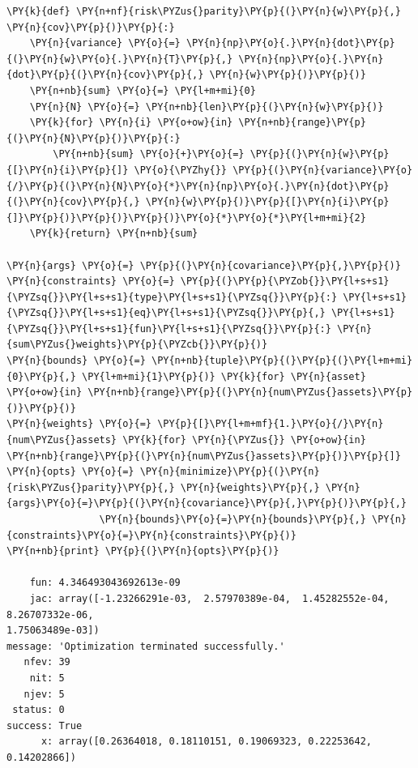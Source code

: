 \begin{tcolorbox}[breakable, size=fbox, boxrule=1pt, pad at break*=1mm,colback=cellbackground, colframe=cellborder]
\begin{Verbatim}[commandchars=\\\{\}]
\PY{k}{def} \PY{n+nf}{risk\PYZus{}parity}\PY{p}{(}\PY{n}{w}\PY{p}{,} \PY{n}{cov}\PY{p}{)}\PY{p}{:}
    \PY{n}{variance} \PY{o}{=} \PY{n}{np}\PY{o}{.}\PY{n}{dot}\PY{p}{(}\PY{n}{w}\PY{o}{.}\PY{n}{T}\PY{p}{,} \PY{n}{np}\PY{o}{.}\PY{n}{dot}\PY{p}{(}\PY{n}{cov}\PY{p}{,} \PY{n}{w}\PY{p}{)}\PY{p}{)} 
    \PY{n+nb}{sum} \PY{o}{=} \PY{l+m+mi}{0}
    \PY{n}{N} \PY{o}{=} \PY{n+nb}{len}\PY{p}{(}\PY{n}{w}\PY{p}{)}
    \PY{k}{for} \PY{n}{i} \PY{o+ow}{in} \PY{n+nb}{range}\PY{p}{(}\PY{n}{N}\PY{p}{)}\PY{p}{:}
        \PY{n+nb}{sum} \PY{o}{+}\PY{o}{=} \PY{p}{(}\PY{n}{w}\PY{p}{[}\PY{n}{i}\PY{p}{]} \PY{o}{\PYZhy{}} \PY{p}{(}\PY{n}{variance}\PY{o}{/}\PY{p}{(}\PY{n}{N}\PY{o}{*}\PY{n}{np}\PY{o}{.}\PY{n}{dot}\PY{p}{(}\PY{n}{cov}\PY{p}{,} \PY{n}{w}\PY{p}{)}\PY{p}{[}\PY{n}{i}\PY{p}{]}\PY{p}{)}\PY{p}{)}\PY{p}{)}\PY{o}{*}\PY{o}{*}\PY{l+m+mi}{2} 
    \PY{k}{return} \PY{n+nb}{sum}
	
\PY{n}{args} \PY{o}{=} \PY{p}{(}\PY{n}{covariance}\PY{p}{,}\PY{p}{)}
\PY{n}{constraints} \PY{o}{=} \PY{p}{(}\PY{p}{\PYZob{}}\PY{l+s+s1}{\PYZsq{}}\PY{l+s+s1}{type}\PY{l+s+s1}{\PYZsq{}}\PY{p}{:} \PY{l+s+s1}{\PYZsq{}}\PY{l+s+s1}{eq}\PY{l+s+s1}{\PYZsq{}}\PY{p}{,} \PY{l+s+s1}{\PYZsq{}}\PY{l+s+s1}{fun}\PY{l+s+s1}{\PYZsq{}}\PY{p}{:} \PY{n}{sum\PYZus{}weights}\PY{p}{\PYZcb{}}\PY{p}{)} 
\PY{n}{bounds} \PY{o}{=} \PY{n+nb}{tuple}\PY{p}{(}\PY{p}{(}\PY{l+m+mi}{0}\PY{p}{,} \PY{l+m+mi}{1}\PY{p}{)} \PY{k}{for} \PY{n}{asset} \PY{o+ow}{in} \PY{n+nb}{range}\PY{p}{(}\PY{n}{num\PYZus{}assets}\PY{p}{)}\PY{p}{)}
\PY{n}{weights} \PY{o}{=} \PY{p}{[}\PY{l+m+mf}{1.}\PY{o}{/}\PY{n}{num\PYZus{}assets} \PY{k}{for} \PY{n}{\PYZus{}} \PY{o+ow}{in} \PY{n+nb}{range}\PY{p}{(}\PY{n}{num\PYZus{}assets}\PY{p}{)}\PY{p}{]}
\PY{n}{opts} \PY{o}{=} \PY{n}{minimize}\PY{p}{(}\PY{n}{risk\PYZus{}parity}\PY{p}{,} \PY{n}{weights}\PY{p}{,} \PY{n}{args}\PY{o}{=}\PY{p}{(}\PY{n}{covariance}\PY{p}{,}\PY{p}{)}\PY{p}{,}
                \PY{n}{bounds}\PY{o}{=}\PY{n}{bounds}\PY{p}{,} \PY{n}{constraints}\PY{o}{=}\PY{n}{constraints}\PY{p}{)}
\PY{n+nb}{print} \PY{p}{(}\PY{n}{opts}\PY{p}{)}

    fun: 4.346493043692613e-09
    jac: array([-1.23266291e-03,  2.57970389e-04,  1.45282552e-04,
8.26707332e-06,
1.75063489e-03])
message: 'Optimization terminated successfully.'
   nfev: 39
    nit: 5
   njev: 5
 status: 0
success: True
      x: array([0.26364018, 0.18110151, 0.19069323, 0.22253642, 0.14202866])
\end{Verbatim}
\end{tcolorbox}

